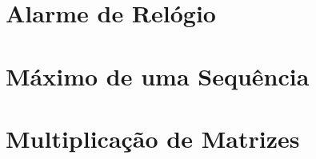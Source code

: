 \newpage
\section{Alarme de Relógio}
	

\newpage
\section{Máximo de uma Sequência}
	

\newpage
\section{Multiplicação de Matrizes}
	

